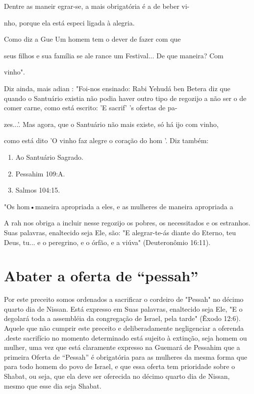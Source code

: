 Dentre as maneir egrar-se, a mais obrigatória é a de beber vi-

nho, porque ela está especi ligada à alegria.

Como diz a Gue Um homem tem o dever de fazer com que

seus filhos e sua família se ale rance um Festival... De que maneira?
Com

vinho".

Diz ainda, mais adian : "Foi-nos ensinado: Rabi Yehudá ben Bete­ra diz
que quando o Santuário existia não podia haver outro tipo de regozijo a
não ser o de comer carne, como está escrito: 'E sacrif' 's ofertas de
pa-

zes...'. Mas agora, que o Santuário não mais existe, só há ijo com
vinho,

como está dito 'O vinho faz alegre o coração do hom '. Diz também:


\begin{enumerate}
\def\labelenumi{\arabic{enumi}.}
\setcounter{enumi}{70}
\item
 
 Ao Santuário Sagrado.
 
\item
 
 Pessahim 109:A.
 
\item
 
 Salmos 104:15.
 
\end{enumerate}



"Os hom•maneira apropriada a eles, e as mulheres de maneira apro­priada
a

A rah nos obriga a incluir nesse regozijo os pobres, os necessita­dos e
os estranhos. Suas palavras, enaltecido seja Ele, são: "E alegrar-te-ás
dian­te do Eterno, teu Deus, tu... e o peregrino, e o órfão, e a viúva"
(Deuteronômio 16:11).


\section{Abater a oferta de ``pessah''}


Por este preceito somos ordenados a sacrificar o cordeiro de "Pes­sah"
no décimo quarto dia de Nissan. Está expresso em Suas palavras,
enalteci­do seja Ele, "E o degolará toda a assembléia da congregação de
Israel, pela tar­de" (Êxodo 12:6). Aquele que não cumprir este preceito
e deliberadamente ne­gligenciar a oferenda .deste sacrifício no momento
determinado está sujeito à extinção, seja homem ou mulher, uma vez que
está claramente expresso na Gue­mará de Pessahim que a primeira Oferta
de ``Pessah'' é obrigatória para as mu­lheres da mesma forma que para todo
homem do povo de Israel, e que essa oferta tem prioridade sobre o
Shabat, ou seja, que ela deve ser oferecida no décimo quarto dia de
Nissan, mesmo que esse dia seja Shabat.


